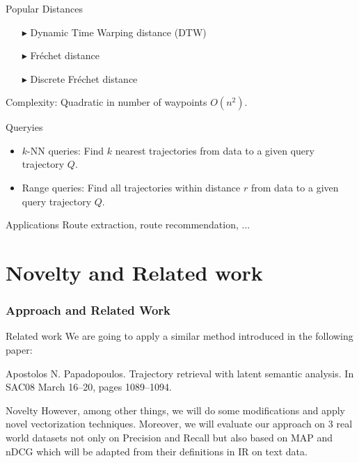 \documentclass{beamer}
\begin{document}
\begin{frame}
\frametitle{}
\begin{block}{Popular Distances}
\begin{itemize}
\item [$\blacktriangleright$] Dynamic Time Warping distance (DTW)

\item [$\blacktriangleright$] Fr\'echet distance 

\item [$\blacktriangleright$] Discrete Fr\'echet distance \pause 
\end{itemize}
Complexity: {\color{orange} Quadratic in number of waypoints $O(n^2)$}.
\end{block} \pause

\begin{block}{Queryies}
\begin{itemize}
\item {\color{blue} $k$-NN queries:} Find $k$ nearest trajectories from data to a given query trajectory $Q$.
\item {\color{blue} Range queries:} Find all trajectories within distance $r$ from data to a given query trajectory $Q$.
\end{itemize}
\end{block} \pause

\begin{block}{Applications}
{\small Route extraction, route recommendation, ...}
\end{block}
\end{frame}



\section{Novelty and Related work}


\begin{frame}
\frametitle{Approach and Related Work}  \vspace{-2mm}
\begin{block}{Related work}  \vspace{2mm}
We are going to apply a similar method introduced in the following paper: \vspace{3mm}

{\color{magenta} \small Apostolos N. Papadopoulos. Trajectory retrieval with latent semantic analysis. In SAC08 March 16--20, pages 1089--1094.} \vspace{2mm} \pause
\end{block}
\begin{block}{Novelty}  \vspace{2mm}
However, among other things, we will do some modifications and apply novel vectorization techniques. Moreover, we will evaluate our approach on 3 real world datasets not only on Precision and Recall but also based on MAP and nDCG which will be adapted from their definitions in IR on text data. 
\end{block}
\end{frame}
\end{document}
